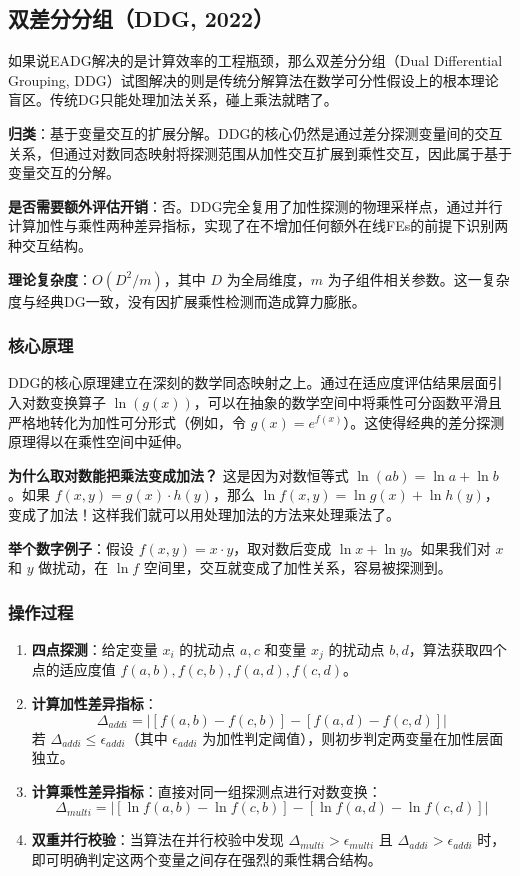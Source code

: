 \subsection{双差分分组（DDG, 2022）}
如果说EADG解决的是计算效率的工程瓶颈，那么双差分分组（Dual Differential Grouping, DDG）试图解决的则是传统分解算法在数学可分性假设上的根本理论盲区。传统DG只能处理加法关系，碰上乘法就瞎了。

\textbf{归类}：基于变量交互的扩展分解。DDG的核心仍然是通过差分探测变量间的交互关系，但通过对数同态映射将探测范围从加性交互扩展到乘性交互，因此属于基于变量交互的分解。

\textbf{是否需要额外评估开销}：否。DDG完全复用了加性探测的物理采样点，通过并行计算加性与乘性两种差异指标，实现了在不增加任何额外在线FEs的前提下识别两种交互结构。

\textbf{理论复杂度}：$O(D^2/m)$，其中 $D$ 为全局维度，$m$ 为子组件相关参数。这一复杂度与经典DG一致，没有因扩展乘性检测而造成算力膨胀。

\subsubsection*{核心原理}
DDG的核心原理建立在深刻的数学同态映射之上。通过在适应度评估结果层面引入对数变换算子 $\ln(g(x))$，可以在抽象的数学空间中将乘性可分函数平滑且严格地转化为加性可分形式（例如，令 $g(x) = e^{f(x)}$）。这使得经典的差分探测原理得以在乘性空间中延伸。

\textbf{为什么取对数能把乘法变成加法？} 这是因为对数恒等式 $\ln(ab) = \ln a + \ln b$。如果 $f(x,y) = g(x) \cdot h(y)$，那么 $\ln f(x,y) = \ln g(x) + \ln h(y)$，变成了加法！这样我们就可以用处理加法的方法来处理乘法了。

\textbf{举个数字例子}：假设 $f(x,y) = x \cdot y$，取对数后变成 $\ln x + \ln y$。如果我们对 $x$ 和 $y$ 做扰动，在 $\ln f$ 空间里，交互就变成了加性关系，容易被探测到。

\subsubsection*{操作过程}
\begin{enumerate}
    \item \textbf{四点探测}：给定变量 $x_i$ 的扰动点 $a, c$ 和变量 $x_j$ 的扰动点 $b, d$，算法获取四个点的适应度值 $f(a,b), f(c,b), f(a,d), f(c,d)$。
    \item \textbf{计算加性差异指标}：
        $$\Delta_{addi} = | [f(a,b) - f(c,b)] - [f(a,d) - f(c,d)] |$$
        若 $\Delta_{addi} \leq \epsilon_{addi}$（其中 $\epsilon_{addi}$ 为加性判定阈值），则初步判定两变量在加性层面独立。
    \item \textbf{计算乘性差异指标}：直接对同一组探测点进行对数变换：
        $$\Delta_{multi} = | [\ln f(a,b) - \ln f(c,b)] - [\ln f(a,d) - \ln f(c,d)] |$$
    \item \textbf{双重并行校验}：当算法在并行校验中发现 $\Delta_{multi} > \epsilon_{multi}$ 且 $\Delta_{addi} > \epsilon_{addi}$ 时，即可明确判定这两个变量之间存在强烈的乘性耦合结构。
\end{enumerate}

